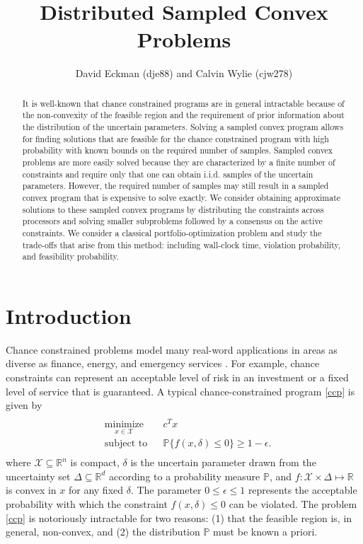\documentclass[12pt]{article}
\title{Distributed Sampled Convex Problems}
\author{David Eckman (dje88) and Calvin Wylie (cjw278)}
\date{}
\begin{document}
\setlength{\parindent}{24pt}

\maketitle

\begin{abstract}
It is well-known that chance constrained programs are in general intractable because of the non-convexity of the feasible region and the requirement of prior information about the distribution of the uncertain parameters.
Solving a sampled convex program allows for finding solutions that are feasible for the chance constrained program with high probability with known bounds on the required number of samples.
Sampled convex problems are more easily solved because they are characterized by a finite number of constraints and require only that one can obtain i.i.d. samples of the uncertain parameters.
However, the required number of samples may still result in a sampled convex program that is expensive to solve exactly.
We consider obtaining approximate solutions to these sampled convex programs by distributing the constraints across processors and solving smaller subproblems followed by a consensus on the active constraints.
We consider a classical portfolio-optimization problem and study the trade-offs that arise from this method: including wall-clock time, violation probability, and feasibility probability.
\end{abstract}

\section*{Introduction}
Chance constrained problems model many real-word applications in areas as diverse as finance, energy, and emergency services \cite{bental09}.
For example, chance constraints can represent an acceptable level of risk in an investment or a fixed level of service that is guaranteed.
A typical chance-constrained program \ref{ccp} is given by
\begin{align}\label{ccp}
\begin{split}
\begin{aligned}
    & \underset{x \in \mathcal{X}}{\text{minimize}}
    & & c^T x \\
    & \text{subject to}
    & & \mathbb{P}\{f(x,\delta) \leq 0\} \geq 1-\epsilon.
\end{aligned}
\end{split} \tag{CCP$_\epsilon$}
\end{align}
where $\mathcal{X} \subseteq \mathbb{R}^n$ is compact, $\delta$ is the uncertain parameter drawn from the uncertainty set $\Delta \subseteq \mathbb{R}^d$ according to a probability measure $\mathbb{P}$, and $f:\mathcal{X} \times \Delta \mapsto \mathbb{R}$ is convex in $x$ for any fixed $\delta$.
The parameter $0 \leq \epsilon \leq 1$ represents the acceptable probability with which the constraint $f(x,\delta) \leq 0$ can be violated.
The problem \ref{ccp} is notoriously intractable for two reasons: (1) that the feasible region is, in general, non-convex, and (2) the distribution $\mathbb{P}$ must be known a priori.
\end{document}
